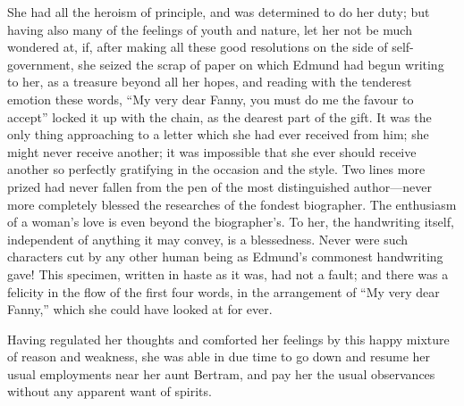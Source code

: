 \documentclass{article}
\begin{document}
She had all the heroism of principle, and was determined
to do her duty; but having also many of the feelings of youth
and nature, let her not be much wondered at, if, after making
all these good resolutions on the side of self-government,
she seized the scrap of paper on which Edmund had begun
writing to her, as a treasure beyond all her hopes,
and reading with the tenderest emotion these words,
``My very dear Fanny, you must do me the favour to accept''
locked it up with the chain, as the dearest part of the gift.
It was the only thing approaching to a letter which she
had ever received from him; she might never receive another;
it was impossible that she ever should receive another
so perfectly gratifying in the occasion and the style.
Two lines more prized had never fallen from the pen
of the most distinguished author---never more completely
blessed the researches of the fondest biographer.
The enthusiasm of a woman's love is even beyond
the biographer's. To her, the handwriting itself,
independent of anything it may convey, is a blessedness.
Never were such characters cut by any other human being
as Edmund's commonest handwriting gave!  This specimen,
written in haste as it was, had not a fault; and there
was a felicity in the flow of the first four words,
in the arrangement of ``My very dear Fanny,'' which she
could have looked at for ever.

Having regulated her thoughts and comforted her feelings
by this happy mixture of reason and weakness, she was able
in due time to go down and resume her usual employments
near her aunt Bertram, and pay her the usual observances
without any apparent want of spirits.
\end{document}
